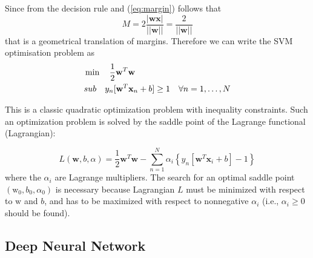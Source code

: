 \documentclass[a4,12pt]{article}
\begin{document}
Since from the decision rule and (\ref{eq:margin}) follows that
\begin{equation}
    M = 2\frac{|\textbf{wx}|}{||\textbf{w}||} = \frac{2}{||\textbf{w}||}
\end{equation}
that is a geometrical translation of margins.
Therefore we can write the SVM optimisation problem as
\begin{equation}\begin{split}\label{eq:softmarginsvm}
&\min \quad \frac{1}{2}\textbf w^T\textbf w\\
&sub \quad  y_n[\textbf w^T\textbf x_n + b]\ge 1\quad \forall n=1, \dots, N
\end{split}\end{equation}

This is a classic quadratic optimization problem with inequality constraints. Such an optimization problem is solved by the saddle point of the
Lagrange functional (Lagrangian):

$$
L(\mathbf{w}, b, \alpha)=\frac{1}{2} \mathbf{w}^{T} \mathbf{w}-\sum_{n=1}^{N} \alpha_{i}\left\{y_{n}\left[\mathbf{w}^{T} \mathbf{x}_{i}+b\right]-1\right\}
$$
where the $\alpha_{i}$ are Lagrange multipliers. The search for an optimal saddle point $\left(\mathrm{w}_{0}, b_{0}, \alpha_{0}\right)$ is necessary because Lagrangian $L$ must be minimized with respect to $\mathrm{w}$ and $b$, and has to be maximized with respect to nonnegative $\alpha_{i}$ (i.e., $\alpha_{i} \geq 0$ should be found). %
%
\subsection{Deep Neural Network}

\end{document}
